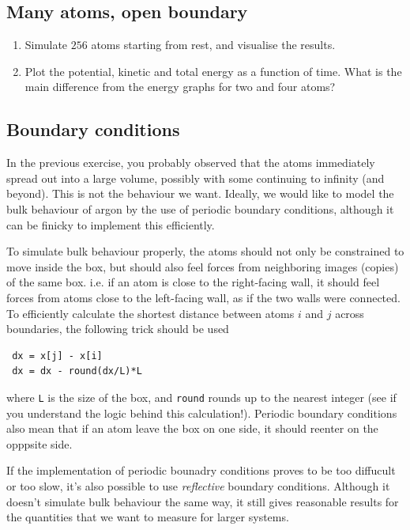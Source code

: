 \documentclass[11pt,british,a4paper]{report}
\begin{document}
\subsection{Many atoms, open boundary}
\begin{enumerate}[label=\roman*.]
    \item Simulate \(256\) atoms starting from rest, and visualise the results.
    \item Plot the potential, kinetic and total energy as a function of time. What is the main difference from the energy graphs for two and four atoms?
\end{enumerate}

\subsection{Boundary conditions}
In the previous exercise, you probably observed that the atoms immediately spread out into a large volume, possibly with some continuing to infinity (and beyond). This is not the behaviour we want. Ideally, we would like to model the bulk behaviour of argon by the use of periodic boundary conditions, although it can be finicky to implement this efficiently.

To simulate bulk behaviour properly, the atoms should not only be constrained to move inside the box, but should also feel forces from neighboring images (copies) of the same box. i.e. if an atom is close to the right-facing wall, it should feel forces from atoms close to the left-facing wall, as if the two walls were connected.
To efficiently calculate the shortest distance between atoms $i$ and $j$ across boundaries, the following trick should be used


\begin{lstlisting}
 dx = x[j] - x[i]
 dx = dx - round(dx/L)*L
\end{lstlisting}

where \texttt{L} is the size of the box, and \texttt{round} rounds up to the nearest integer (see if you understand the logic behind this calculation!). Periodic boundary conditions also mean that if an atom leave the box on one side, it should reenter on the opppsite side. 

If the implementation of periodic bounadry conditions proves to be too diffucult or too slow, it's also possible to use \textit{reflective} boundary conditions. Although it doesn't simulate bulk behaviour the same way, it still gives reasonable results for the quantities that we want to measure for larger systems.
\end{document}

